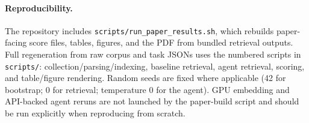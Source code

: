 \documentclass{article}
\begin{document}
\paragraph{Reproducibility.} The repository includes \texttt{scripts/run\_paper\_results.sh}, which rebuilds paper-facing score files, tables, figures, and the PDF from bundled retrieval outputs. Full regeneration from raw corpus and task JSONs uses the numbered scripts in \texttt{scripts/}: collection/parsing/indexing, baseline retrieval, agent retrieval, scoring, and table/figure rendering. Random seeds are fixed where applicable (42 for bootstrap; 0 for retrieval; temperature 0 for the agent). GPU embedding and API-backed agent reruns are not launched by the paper-build script and should be run explicitly when reproducing from scratch.
\end{document}

